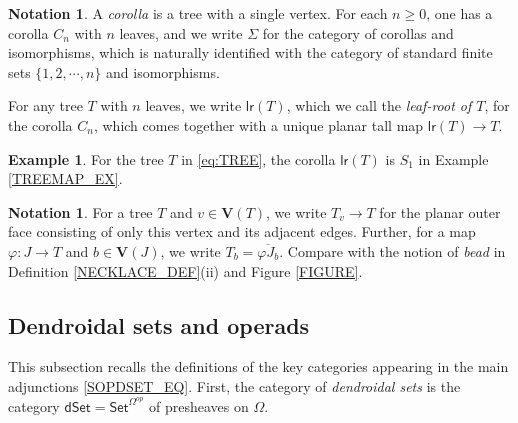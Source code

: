 \documentclass[a4paper,10pt]{article}%
\numberwithin{equation}{section}
\numberwithin{figure}{section}
\theoremstyle{definition} %
\newtheorem{example}[equation]{Example}%
\newtheorem{notation}[equation]{Notation}%
\newcommand{\Set}{\mathsf{Set}}
\newcommand{\dSet}{\mathsf{dSet}}
\begin{document}
\begin{notation}\label{LEAFROOT NOT}
	A \textit{corolla} is a tree with a single vertex.
	For each $n\geq 0$, one has a corolla $C_n$ with $n$ leaves,
	and we write $\Sigma$ for the category of corollas and isomorphisms, which is naturally identified with the category of standard finite sets
	$\{1,2,\cdots,n\}$ and isomorphisms.
	
	For any tree $T$ with $n$ leaves, 
	we write $\mathsf{lr}(T)$,
	which we call the \emph{leaf-root of $T$},
	for the corolla $C_n$,
	which comes together with a unique planar tall map
	$\mathsf{lr}(T) \to T$.
\end{notation}

\begin{example}
	For the tree $T$ in \eqref{eq:TREE},
	the corolla $\mathsf{lr}(T)$ is $S_1$
	in Example \ref{TREEMAP_EX}.
\end{example}



\begin{notation}\label{TV_NOT}
	For a tree $T$ and $v \in \boldsymbol{V}(T)$,
	we write $T_v \to T$ for the planar outer face consisting of only this vertex and its adjacent edges.
	Further, for a map 
	$\varphi \colon J\to T$ and $b \in \boldsymbol{V}(J)$,
	we write
	$T_b = \overline{\varphi J_b}$.
	Compare with the notion of \emph{bead}
	in Definition \ref{NECKLACE_DEF}(ii)
	and Figure \ref{FIGURE}.
\end{notation}



\subsection{Dendroidal sets and operads}
\label{DSETSOPS SEC}


This subsection recalls the definitions
of the key categories appearing in the main adjunctions \eqref{SOPDSET_EQ}.
First, the category of 
\emph{dendroidal sets}
is the category $\dSet = \Set^{\Omega^{op}}$
of presheaves on $\Omega$.
\end{document}
